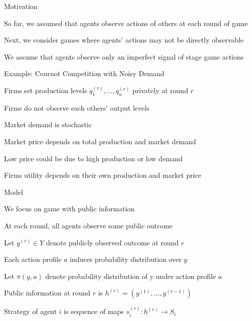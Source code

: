 \documentclass[11pt,aspectratio=169]{beamer}
\begin{document}
  \begin{frame}{Motivation}
   \begin{itemizes}[1.5em]
    \item So far, we assumed that agents observe actions of others at each round of game
    \item Next, we consider games where agents' actions may not be directly observable
    \item We assume that agents observe only an \alert{imperfect signal} of stage game actions
   \end{itemizes}
  \end{frame}   
 
  
  \begin{frame}{Example: Cournot Competition with Noisy Demand\\
  \vspace{-0.2cm}{\scriptsize [Green and Porter, Non-cooperative Collusion under Imperfect Price Information, 1984]}}
   \begin{itemizes}
    \item Firms set production levels $q_1^{(r)}, \dots, q_n^{(r)}$ \alert{privately} at round $r$
    \item Firms do not observe each others' output levels
    \item Market demand is \alert{stochastic}
    \item Market price depends on total production and market demand
    \item Low price could be due to high production or low demand
    \item Firms utility depends on their own production and market price
   \end{itemizes}
  \end{frame}


  \begin{frame}{Model}
   \begin{itemizes}
    \item We focus on game with \alert{public information}
    \item At each round, \alert{all agents} observe some \alert{public outcome}
    \item Let $y^{(r)} \in Y$ denote publicly observed outcome at round $r$
    \item Each action profile $a$ induces \alert{probability distribution} over $y$
    \item Let $\pi (y, a)$ denote probability distribution of y under action profile $a$
    \item Public information at round $r$ is $h^{(r)}=(y^{(1)}, \dots, y^{(r-1)})$
    \item Strategy of agent $i$ is \alert{sequence of maps} $s_i^{(r)}: h^{(r)} \rightarrow S_i$ 
   \end{itemizes}
  \end{frame}
  
\end{document}
